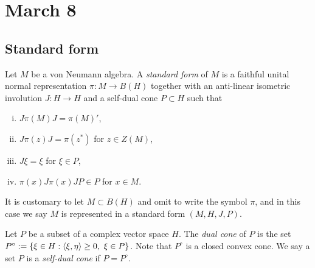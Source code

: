 \documentclass{../../../small}
\begin{document}
\newpage
\section{March 8}


\subsection{Standard form}

\begin{defn}
Let $M$ be a von Neumann algebra.
A \emph{standard form} of $M$ is a faithful unital normal representation $\pi:M\to B(H)$ together with an anti-linear isometric involution $J:H\to H$ and a self-dual cone $P\subset H$ such that
\begin{enumerate}[(i)]
\item $J\pi(M)J=\pi(M)'$,
\item $J\pi(z)J=\pi(z^*)$ for $z\in Z(M)$,
\item $J\xi=\xi$ for $\xi\in P$,
\item $\pi(x)J\pi(x)JP\in P$ for $x\in M$.
\end{enumerate}
It is customary to let $M\subset B(H)$ and omit to write the symbol $\pi$, and in this case we say $M$ is represented in a standard form $(M,H,J,P)$.
\end{defn}

\begin{rmk*}
Let $P$ be a subset of a complex vector space $H$.
The \emph{dual cone} of $P$ is the set $P^\circ:=\{\xi\in H:\langle\xi,\eta\rangle\ge0,\ \xi\in P\}$.
Note that $P^\circ$ is a closed convex cone.
We say a set $P$ is a \emph{self-dual cone} if $P=P^\circ$.
\end{rmk*}
\end{document}
